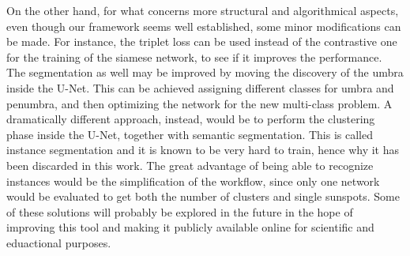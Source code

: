 \bigbreak
\noindent On the other hand, for what concerns more structural and algorithmical aspects, even though our framework seems well established, some minor modifications can be made. For instance, the triplet loss can be used instead of the contrastive one for the training of the siamese network, to see if it improves the performance. The segmentation as well may be improved by moving the discovery of the umbra inside the U-Net. This can be achieved assigning different classes for umbra and penumbra, and then optimizing the network for the new multi-class problem. A dramatically different approach, instead, would be to perform the clustering phase inside the U-Net, together with semantic segmentation. This is called instance segmentation and it is known to be very hard to train, hence why it has been discarded in this work. The great advantage of being able to recognize instances would be the simplification of the workflow, since only one network would be evaluated to get both the number of clusters and single sunspots.
\bigbreak
\noindent Some of these solutions will probably be explored in the future in the hope of improving this tool and making it publicly available online for scientific and eduactional purposes.

